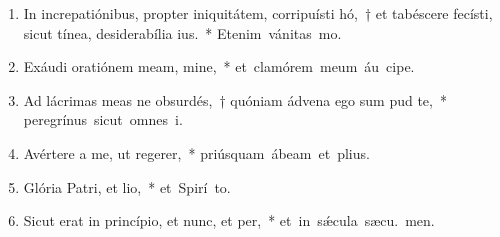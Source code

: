\begin{flushleft}
\begin{enumerate}[leftmargin=*]
\item In increpatiónibus, propter iniquitátem, corripuísti hó,~† et tabéscere fecísti, sicut tínea, desiderabília ius.~* \mbox{Etenim vánitas  mo.}

\item Exáudi oratiónem meam, mine,~* \mbox{et clamórem meum áu cipe.}

\item Ad lácrimas meas ne obsurdés,~† quóniam ádvena ego sum pud te,~* \mbox{peregrínus sicut omnes  i.}

\item Avértere a me, ut regerer,~* \mbox{priúsquam ábeam et   plius.}

\item Glória Patri, et lio,~* \mbox{et Spirí to.}

\item Sicut erat in princípio, et nunc, et per,~* \mbox{et in s\'{\ae}cula sæcu. men.}

\end{enumerate}
\end{flushleft}

